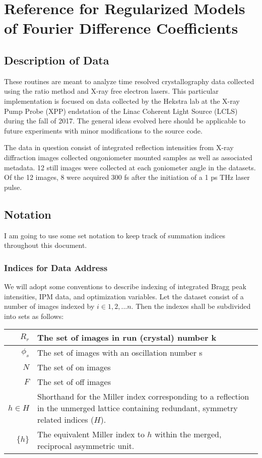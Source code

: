 \documentclass{report}
\begin{document}
\chapter{Reference for Regularized Models of Fourier Difference Coefficients}
\section{Description of Data}
These routines are meant to analyze time resolved crystallography data collected using the ratio method and X-ray free electron lasers. This particular implementation is focused on data collected by the Hekstra lab at the X-ray Pump Probe (XPP) endstation of the Linac Coherent Light Source (LCLS) during the fall of 2017. The general ideas evolved here should be applicable to future experiments with minor modifications to the source code. 

The data in question consist of integrated reflection intensities from X-ray diffraction images collected ongoniometer mounted samples as well as associated metadata. 12 still images were collected at each goniometer angle in the datasets. Of the 12 images, 8 were acquired 300 fs after the initiation of a 1 ps THz laser pulse. 

\section{Notation}
I am going to use some set notation to keep track of summation indices throughout this document. 


\subsection{Indices for Data Address}
We will adopt some conventions to describe indexing of integrated Bragg peak intensities, IPM data, and optimization variables.
Let the dataset consist of a number of images indexed by $i\in {1, 2, ... n}$.
Then the indexes shall be subdivided into sets as follows:
\break


\begin{center}
\begin{tabular}{r | p{}}
$R_r$ & The set of images in run (crystal) number k \\ \hline
$\phi_s$ & The set of images with an oscillation number s \\ \hline
$N$ & The set of on images \\ \hline
$F$ & The set of off images \\ \hline
$h\in H$ & Shorthand for the Miller index corresponding to a reflection in the unmerged lattice containing redundant, symmetry related indices ($H$). \\ \hline
$\{h\}$ & The equivalent Miller index to $h$ within the merged, reciprocal asymmetric unit.
\end{tabular} 
\end{center}
\end{document}

